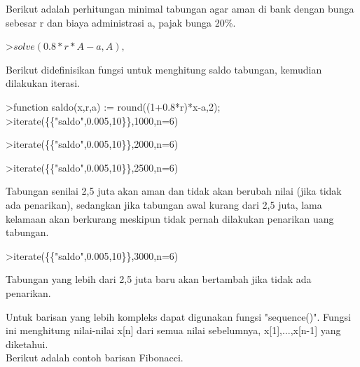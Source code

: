 \documentclass[a4paper,10pt]{article}
\begin{document}
\begin{eulernotebook}
\begin{eulercomment}
\begin{eulercomment}
\begin{eulercomment}
\begin{eulercomment}
\begin{eulercomment}
Berikut adalah perhitungan minimal tabungan agar aman di bank dengan bunga sebesar r dan
biaya administrasi a, pajak bunga 20\%.
\end{eulercomment}
\begin{eulerprompt}
>$solve(0.8*r*A-a,A), $%
\end{eulerprompt}
\begin{eulercomment}
Berikut didefinisikan fungsi untuk menghitung saldo tabungan, kemudian dilakukan iterasi.
\end{eulercomment}
\begin{eulerprompt}
>function saldo(x,r,a) := round((1+0.8*r)*x-a,2);
>iterate(\{\{"saldo",0.005,10\}\},1000,n=6)
\end{eulerprompt}
\begin{euleroutput}
  [1000,  994,  987.98,  981.93,  975.86,  969.76,  963.64]
\end{euleroutput}
\begin{eulerprompt}
>iterate(\{\{"saldo",0.005,10\}\},2000,n=6)
\end{eulerprompt}
\begin{euleroutput}
  [2000,  1998,  1995.99,  1993.97,  1991.95,  1989.92,  1987.88]
\end{euleroutput}
\begin{eulerprompt}
>iterate(\{\{"saldo",0.005,10\}\},2500,n=6)
\end{eulerprompt}
\begin{euleroutput}
  [2500,  2500,  2500,  2500,  2500,  2500,  2500]
\end{euleroutput}
\begin{eulercomment}
Tabungan senilai 2,5 juta akan aman dan tidak akan berubah nilai (jika tidak ada penarikan),
sedangkan jika tabungan awal kurang dari 2,5 juta, lama kelamaan akan berkurang meskipun
tidak pernah dilakukan penarikan uang tabungan.
\end{eulercomment}
\begin{eulerprompt}
>iterate(\{\{"saldo",0.005,10\}\},3000,n=6)
\end{eulerprompt}
\begin{euleroutput}
  [3000,  3002,  3004.01,  3006.03,  3008.05,  3010.08,  3012.12]
\end{euleroutput}
\begin{eulercomment}
Tabungan yang lebih dari 2,5 juta baru akan bertambah jika tidak ada penarikan.

Untuk barisan yang lebih kompleks dapat digunakan fungsi "sequence()". Fungsi ini menghitung
nilai-nilai x[n] dari semua nilai sebelumnya, x[1],...,x[n-1] yang diketahui.\\
Berikut adalah contoh barisan Fibonacci.


\end{eulercomment}
\end{eulercomment}
\end{eulercomment}
\end{eulercomment}
\end{eulercomment}
\end{eulernotebook}
\end{document}
